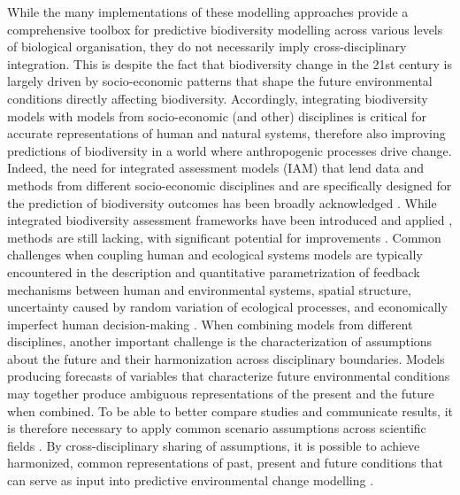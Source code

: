 While the many implementations of these modelling approaches provide a comprehensive toolbox for predictive biodiversity modelling across various levels of biological organisation, they do not necessarily imply cross-disciplinary integration. This is despite the fact that biodiversity change in the 21st century is largely driven by socio-economic patterns that shape the future environmental conditions directly affecting biodiversity. Accordingly, integrating biodiversity models with models from socio-economic (and other) disciplines is critical for accurate representations of human and natural systems, therefore also improving predictions of biodiversity in a world where anthropogenic processes drive change. Indeed, the need for integrated assessment models (IAM) that lend data and methods from different socio-economic disciplines and are specifically designed for the prediction of biodiversity outcomes has been broadly acknowledged \citep{ipbes_summary_2016, ipbes_summary_2019}. While integrated biodiversity assessment frameworks have been introduced and applied \citep{newbold2019climate, kapitza_assessing_2021, leclere_bending_2020}, methods are still lacking, with significant potential for improvements \citep{titeux_global_2017}. Common challenges when coupling human and ecological systems models are typically encountered in the description and quantitative parametrization of feedback mechanisms between human and environmental systems, spatial structure, uncertainty caused by random variation of ecological processes, and economically imperfect human decision-making \citep{drechsler_model-based_2020}. When combining models from different disciplines, another important challenge is the characterization of assumptions about the future and their harmonization across disciplinary boundaries. Models producing forecasts of variables that characterize future environmental conditions may together produce ambiguous representations of the present and the future when combined. To be able to better compare studies and communicate results, it is therefore necessary to apply common scenario assumptions across scientific fields \citep{van_vuuren_representative_2011}. By cross-disciplinary sharing of assumptions, it is possible to achieve harmonized, common representations of past, present and future conditions that can serve as input into predictive environmental change modelling \citep{hurtt_harmonization_2011}.

